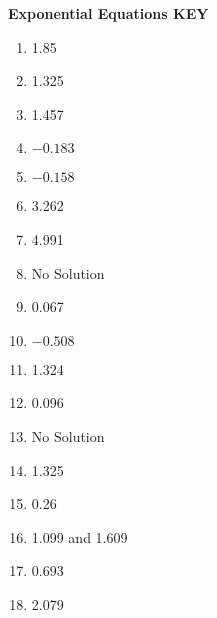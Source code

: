 \documentclass[11pt]{article}
\begin{document}
\newpage


\textbf{Exponential Equations KEY}
\begin{enumerate}
    \item 1.85
    \item 1.325
    \item 1.457
    \item $-0.183$
    \item $-0.158$
    \item 3.262
    \item 4.991
    \item No Solution
    \item 0.067
    \item $-0.508$
    \item 1.324
    \item 0.096
    \item No Solution
    \item 1.325
    \item 0.26
    \item 1.099 and 1.609
    \item 0.693
    \item 2.079
\end{enumerate}
\end{document}
